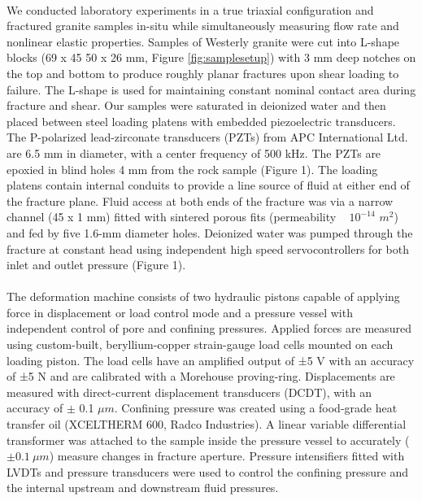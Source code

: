 \documentclass[letterpaper,10pt]{article}
\begin{document}
\paragraph{} We conducted laboratory experiments in a true triaxial configuration and fractured granite samples in-situ while simultaneously measuring flow rate and nonlinear elastic properties. Samples of Westerly granite were cut  into L-shape blocks (69 x 45 50 x 26 mm, Figure \ref{fig:samplesetup}) with 3 mm deep notches on the top and bottom to produce roughly planar fractures upon shear loading to failure. The L-shape is used for maintaining constant nominal contact area during fracture and shear. Our samples were saturated in deionized water and then placed between steel loading platens  with  embedded piezoelectric transducers. The P-polarized lead-zirconate transducers (PZTs) from APC International Ltd. are 6.5 mm in diameter, with a center frequency of 500 kHz. The PZTs are epoxied in blind holes 4 mm from the rock sample (Figure 1). The loading platens contain internal conduits to provide a line source of fluid at either end of the fracture plane. Fluid access at both ends of the fracture was via a narrow channel (45 x 1 mm) fitted with sintered porous fits (permeability ~ $10^{-14}$ $m^2$) and fed by five 1.6-mm diameter holes.  Deionized water was pumped through the fracture at constant head using independent high speed servocontrollers for both inlet and outlet pressure (Figure 1).

\paragraph{} The deformation machine consists of two hydraulic pistons capable of applying force in displacement or load control mode and a pressure vessel with independent control of pore and confining pressures. Applied forces are measured using custom-built, beryllium-copper strain-gauge load cells mounted on each loading piston. The load cells have an amplified output of ±5 V with an accuracy of ±5 N and are calibrated with a Morehouse proving-ring. Displacements are measured with direct-current displacement transducers (DCDT), with an accuracy of $\pm$ 0.1 $\mu m$. Confining pressure was created using a food-grade heat transfer oil (XCELTHERM 600, Radco Industries). A linear variable differential transformer was attached to the sample inside the pressure vessel to accurately ($\pm 0.1\ \mu m$) measure changes in fracture aperture. Pressure intensifiers fitted with LVDTs and pressure transducers were used to control the confining pressure and the internal upstream and downstream fluid pressures.
\end{document}
